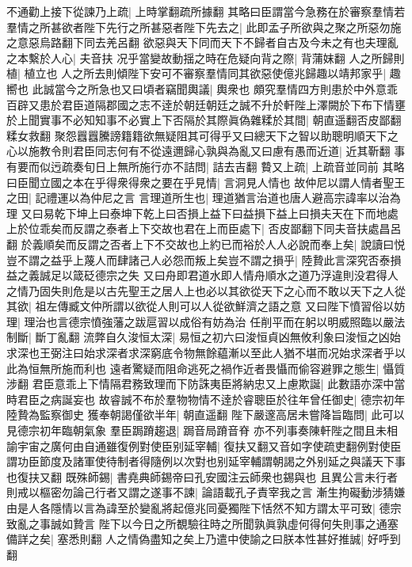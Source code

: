 不通勸上接下從諫乃上疏|{
	上時掌翻疏所據翻}
其略曰臣謂當今急務在於審察羣情若羣情之所甚欲者陛下先行之所甚惡者陛下先去之|{
	此即孟子所欲與之聚之所惡勿施之意惡烏路翻下同去羌呂翻}
欲惡與天下同而天下不歸者自古及今未之有也夫理亂之本繫於人心|{
	夫音扶}
况乎當變故動揺之時在危疑向背之際|{
	背蒲妺翻}
人之所歸則植|{
	植立也}
人之所去則傾陛下安可不審察羣情同其欲惡使億兆歸趣以靖邦家乎|{
	趣嚮也}
此誠當今之所急也又曰頃者竊聞輿議|{
	輿衆也}
頗究羣情四方則患於中外意乖百辟又患於君臣道隔郡國之志不逹於朝廷朝廷之誠不升於軒陛上澤闕於下布下情壅於上聞實事不必知知事不必實上下否隔於其際眞偽雜糅於其間|{
	朝直遥翻否皮鄙翻糅女救翻}
聚怨囂囂騰謗籍籍欲無疑阻其可得乎又曰總天下之智以助聰明順天下之心以施教令則君臣同志何有不從遠邇歸心孰與為亂又曰慮有愚而近道|{
	近其靳翻}
事有要而似迃疏奏旬日上無所施行亦不詰問|{
	詰去吉翻}
䞇又上疏|{
	上疏音並同前}
其略曰臣聞立國之本在乎得衆得衆之要在乎見情|{
	言洞見人情也}
故仲尼以謂人情者聖王之田|{
	記禮運以為仲尼之言}
言理道所生也|{
	理道猶言治道也唐人避高宗諱率以治為理}
又曰易乾下坤上曰泰坤下乾上曰否損上益下曰益損下益上曰損夫天在下而地處上於位乖矣而反謂之泰者上下交故也君在上而臣處下|{
	否皮鄙翻下同夫音扶處昌呂翻}
於義順矣而反謂之否者上下不交故也上約已而裕於人人必說而奉上矣|{
	說讀曰悦}
豈不謂之益乎上蔑人而肆諸己人必怨而叛上矣豈不謂之損乎|{
	陸贄此言深究否泰損益之義誠足以箴砭德宗之失}
又曰舟即君道水即人情舟順水之道乃浮違則没君得人之情乃固失則危是以古先聖王之居人上也必以其欲從天下之心而不敢以天下之人從其欲|{
	祖左傳臧文仲所謂以欲從人則可以人從欲鮮濟之語之意}
又曰陛下憤習俗以妨理|{
	理治也言德宗憤強藩之跋扈習以成俗有妨為治}
任削平而在躬以明威照臨以嚴法制斷|{
	斷丁亂翻}
流弊自久浚恒太深|{
	易恒之初六曰浚恒貞凶無攸利象曰浚恒之凶始求深也王弼注曰始求深者求深窮底令物無餘藴漸以至此人猶不堪而况始求深者乎以此為恒無所施而利也}
遠者驚疑而阻命逃死之禍作近者畏懾而偷容避罪之態生|{
	懾質涉翻}
君臣意乖上下情隔君務致理而下防誅夷臣將納忠又上慮欺誕|{
	此數語亦深中當時君臣之病誕妄也}
故睿誠不布於羣物物情不逹於睿聰臣於往年曾任御史|{
	德宗初年陸贄為監察御史}
獲奉朝謁僅欲半年|{
	朝直遥翻}
陛下嚴邃高居未嘗降旨臨問|{
	此可以見德宗初年臨朝氣象}
羣臣跼蹐趨退|{
	跼音局蹐音脊}
亦不列事奏陳軒陛之間且未相諭宇宙之廣何由自通雖復例對使臣别延宰輔|{
	復扶又翻又音如字使疏吏翻例對使臣謂功臣節度及諸軍使待制者得隨例以次對也别延宰輔謂朝謁之外别延之與議天下事也復扶又翻}
既殊師錫|{
	書堯典師錫帝曰孔安國注云師衆也錫與也}
且異公言未行者則戒以樞密勿論己行者又謂之遂事不諫|{
	論語載孔子責宰我之言}
漸生拘礙動涉猜嫌由是人各隱情以言為諱至於變亂將起億兆同憂獨陛下恬然不知方謂太平可致|{
	德宗致亂之事誠如贄言}
陛下以今日之所覩驗往時之所聞孰眞孰虛何得何失則事之通塞備詳之矣|{
	塞悉則翻}
人之情偽盡知之矣上乃遣中使諭之曰朕本性甚好推誠|{
	好呼到翻}
